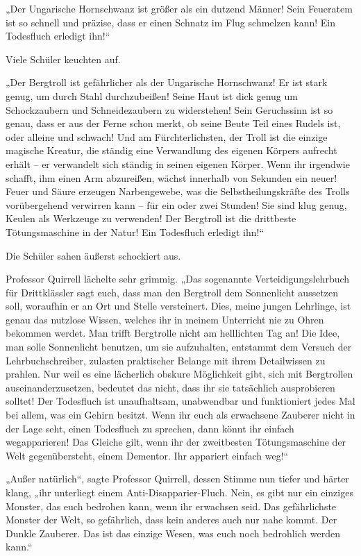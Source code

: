 {„Der Ungarische Hornschwanz ist größer als ein dutzend Männer! Sein Feueratem ist so schnell und präzise, dass er einen Schnatz im Flug schmelzen kann! Ein Todesfluch erledigt ihn!“

Viele Schüler keuchten auf.

„Der Bergtroll ist gefährlicher als der Ungarische Hornschwanz! Er ist stark genug, um durch Stahl durchzubeißen! Seine Haut ist dick genug um Schockzaubern und Schneidezaubern zu widerstehen! Sein Geruchssinn ist so genau, dass er aus der Ferne schon merkt, ob seine Beute Teil eines Rudels ist, oder alleine und schwach! Und am Fürchterlichsten, der Troll ist die einzige magische Kreatur, die ständig eine Verwandlung des eigenen Körpers aufrecht erhält -- er verwandelt sich ständig in seinen eigenen Körper. Wenn ihr irgendwie schafft, ihm einen Arm abzureißen, wächst innerhalb von Sekunden ein neuer! Feuer und Säure erzeugen Narbengewebe, was die Selbstheilungskräfte des Trolls vorübergehend verwirren kann -- für ein oder zwei Stunden! Sie sind klug genug, Keulen als Werkzeuge zu verwenden! Der Bergtroll ist die drittbeste Tötungsmaschine in der Natur! Ein Todesfluch erledigt ihn!“

Die Schüler sahen äußerst schockiert aus.

Professor Quirrell lächelte sehr grimmig. „Das sogenannte Verteidigungslehrbuch für Drittklässler sagt euch, dass man den Bergtroll dem Sonnenlicht aussetzen soll, woraufhin er an Ort und Stelle versteinert. Dies, meine jungen Lehrlinge, ist genau das nutzlose Wissen, welches ihr in meinem Unterricht nie zu Ohren bekommen werdet. Man trifft Bergtrolle nicht am helllichten Tag an! Die Idee, man solle Sonnenlicht benutzen, um sie aufzuhalten, entstammt dem Versuch der Lehrbuchschreiber, zulasten praktischer Belange mit ihrem Detailwissen zu prahlen. Nur weil es eine lächerlich obskure Möglichkeit gibt, sich mit Bergtrollen auseinanderzusetzen, bedeutet das nicht, dass ihr sie tatsächlich ausprobieren solltet! Der Todesfluch ist unaufhaltsam, unabwendbar und funktioniert jedes Mal bei allem, was ein Gehirn besitzt. Wenn ihr euch als erwachsene Zauberer nicht in der Lage seht, einen Todesfluch zu sprechen, dann könnt ihr einfach wegapparieren! Das Gleiche gilt, wenn ihr der zweitbesten Tötungsmaschine der Welt gegenübersteht, einem Dementor. Ihr appariert einfach weg!“

„Außer natürlich“, sagte Professor Quirrell, dessen Stimme nun tiefer und härter klang, „ihr unterliegt einem Anti-Disapparier-Fluch. Nein, es gibt nur ein einziges Monster, das euch bedrohen kann, wenn ihr erwachsen seid. Das gefährlichste Monster der Welt, so gefährlich, dass kein anderes auch nur nahe kommt. Der Dunkle Zauberer. Das ist das einzige Wesen, was euch noch bedrohlich werden kann.“

}
